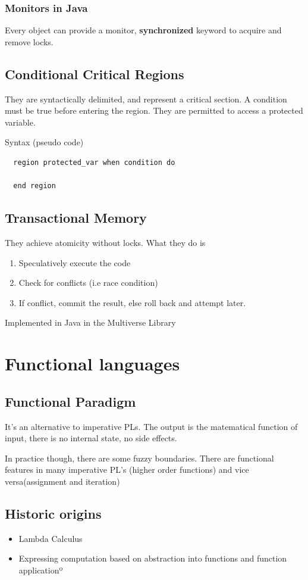 \documentclass{article}
\begin{document}
\subsubsection{Monitors in Java}
Every object can provide a monitor, \textbf{synchronized} keyword to acquire and remove locks.

\subsection{Conditional Critical Regions}
They are syntactically delimited, and represent a critical section. A condition must be true before entering the region. They are permitted to access a protected variable.

Syntax (pseudo code)
\begin{lstlisting}
  region protected_var when condition do

  end region
\end{lstlisting}
\subsection{Transactional Memory}
They achieve atomicity without locks. What they do is
\begin{enumerate}
  \item Speculatively execute the code
  \item Check for conflicts (i.e race condition)
  \item If conflict, commit the result, else roll back and attempt later.
\end{enumerate}


Implemented in Java in the Multiverse Library

\section{Functional languages}
\subsection{Functional Paradigm}
It's an alternative to imperative PLs. The output is the matematical function of input, there is no internal state, no side effects.

In practice though, there are some fuzzy boundaries. There are functional features in many imperative PL's (higher order functions) and vice versa(assignment and iteration)

\subsection{Historic origins}
\begin{itemize}
  \item Lambda Calculus
  \item Expressing computation based on abstraction into functions and function applicationº
\end{itemize}
\end{document}
